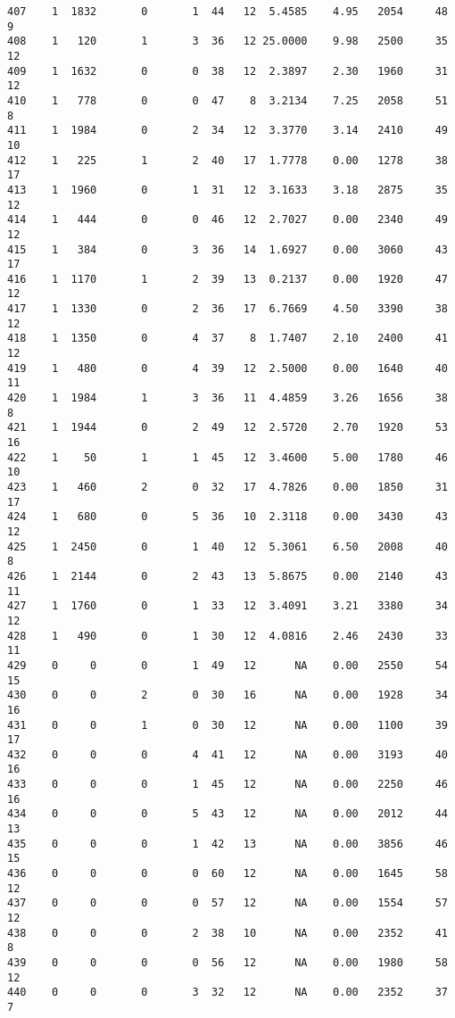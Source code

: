\documentclass[
  letterpaper,
  DIV=11,
  numbers=noendperiod]{scrreprt}
\begin{document}
\begin{verbatim}
407    1  1832       0       1  44   12  5.4585    4.95   2054     48       9
408    1   120       1       3  36   12 25.0000    9.98   2500     35      12
409    1  1632       0       0  38   12  2.3897    2.30   1960     31      12
410    1   778       0       0  47    8  3.2134    7.25   2058     51       8
411    1  1984       0       2  34   12  3.3770    3.14   2410     49      10
412    1   225       1       2  40   17  1.7778    0.00   1278     38      17
413    1  1960       0       1  31   12  3.1633    3.18   2875     35      12
414    1   444       0       0  46   12  2.7027    0.00   2340     49      12
415    1   384       0       3  36   14  1.6927    0.00   3060     43      17
416    1  1170       1       2  39   13  0.2137    0.00   1920     47      12
417    1  1330       0       2  36   17  6.7669    4.50   3390     38      12
418    1  1350       0       4  37    8  1.7407    2.10   2400     41      12
419    1   480       0       4  39   12  2.5000    0.00   1640     40      11
420    1  1984       1       3  36   11  4.4859    3.26   1656     38       8
421    1  1944       0       2  49   12  2.5720    2.70   1920     53      16
422    1    50       1       1  45   12  3.4600    5.00   1780     46      10
423    1   460       2       0  32   17  4.7826    0.00   1850     31      17
424    1   680       0       5  36   10  2.3118    0.00   3430     43      12
425    1  2450       0       1  40   12  5.3061    6.50   2008     40       8
426    1  2144       0       2  43   13  5.8675    0.00   2140     43      11
427    1  1760       0       1  33   12  3.4091    3.21   3380     34      12
428    1   490       0       1  30   12  4.0816    2.46   2430     33      11
429    0     0       0       1  49   12      NA    0.00   2550     54      15
430    0     0       2       0  30   16      NA    0.00   1928     34      16
431    0     0       1       0  30   12      NA    0.00   1100     39      17
432    0     0       0       4  41   12      NA    0.00   3193     40      16
433    0     0       0       1  45   12      NA    0.00   2250     46      16
434    0     0       0       5  43   12      NA    0.00   2012     44      13
435    0     0       0       1  42   13      NA    0.00   3856     46      15
436    0     0       0       0  60   12      NA    0.00   1645     58      12
437    0     0       0       0  57   12      NA    0.00   1554     57      12
438    0     0       0       2  38   10      NA    0.00   2352     41       8
439    0     0       0       0  56   12      NA    0.00   1980     58      12
440    0     0       0       3  32   12      NA    0.00   2352     37       7

\end{verbatim}
\end{document}
